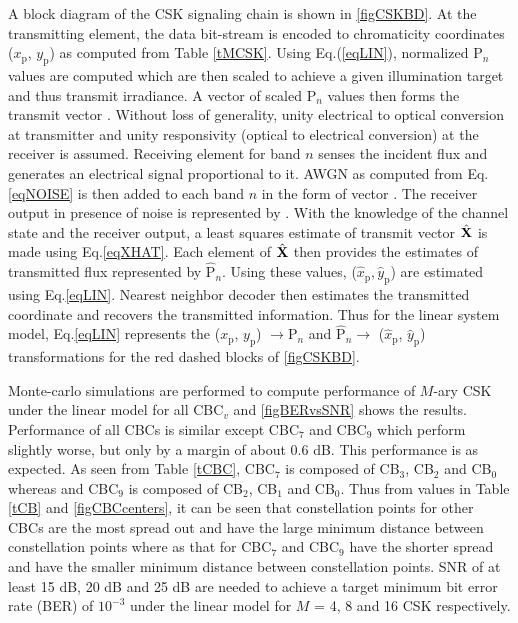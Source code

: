 A block diagram of the CSK signaling chain is shown in \figurename{ }\ref{figCSKBD}. At the transmitting element, the data bit-stream is encoded to chromaticity coordinates ($x_{\text{p}}$, $y_{\text{p}}$) as computed from Table \ref{tMCSK}. Using Eq.(\ref{eqLIN}), normalized P$_{n}$ values are computed which are then scaled to achieve a given illumination target and thus transmit irradiance. A vector of scaled P$_{n}$ values then forms the transmit vector . Without loss of generality, unity electrical to optical conversion at transmitter and unity responsivity (optical to electrical conversion) at the receiver is assumed. Receiving element for band $n$ senses the incident flux and generates an electrical signal proportional to it. AWGN as computed from Eq.\eqref{eqNOISE} is then added to each band $n$ in the form of vector . The receiver output in presence of noise is represented by . With the knowledge of the channel state and the receiver output, a least squares estimate of transmit vector $\hat{{\bf{X}}}$ is made using Eq.\eqref{eqXHAT}. Each element of $\hat{{\bf{X}}}$ then provides the estimates of transmitted flux represented by $\hat{\text{P}}_{n}$. Using these values, ($\hat{x}_{\text{p}}, \hat{y}_{\text{p}}$) are estimated using Eq.\eqref{eqLIN}. Nearest neighbor decoder then estimates the transmitted coordinate and recovers the transmitted information. Thus for the linear system model, Eq.\eqref{eqLIN} represents the ($x_{\text{p}}$, $y_{\text{p}}$) $\rightarrow  \text{P}_{n}$ and $\hat{\text{P}}_{n}\rightarrow$ ($\hat{x}_{\text{p}}$, $\hat{y}_{\text{p}}$) transformations for the red dashed blocks of \figurename{ }\ref{figCSKBD}.

Monte-carlo simulations are performed to compute performance of $M$-ary CSK under the linear model for all CBC$_{v}$ and \figurename{ }\ref{figBERvsSNR} shows the results. Performance of all CBCs is similar except CBC$_{7}$ and CBC$_{9}$ which perform slightly worse, but only by a margin of about 0.6 dB. This performance is as expected. As seen from Table \ref{tCBC}, CBC$_{7}$ is composed of CB$_{3}$, CB$_{2}$ and CB$_{0}$ whereas and CBC$_{9}$ is composed of CB$_{2}$, CB$_{1}$ and CB$_{0}$. Thus from values in Table \ref{tCB} and \figurename{ }\ref{figCBCcenters}, it can be seen that constellation points for other CBCs are the most spread out and have the large minimum distance between constellation points where as that for CBC$_{7}$ and CBC$_{9}$ have the shorter spread and have the smaller minimum distance between constellation points. SNR of at least 15 dB, 20 dB and 25 dB are needed to achieve a target minimum bit error rate (BER) of $10^{-3}$ under the linear model for $M$ = 4, 8 and 16 CSK respectively.

